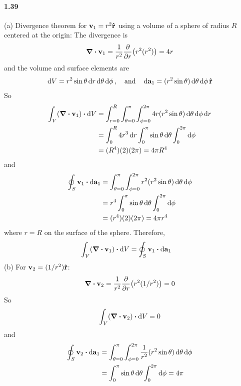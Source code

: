 \documentclass[../main.tex]{subfiles}
\begin{document}
\paragraph{1.39}
(a) Divergence theorem for $\vb{v}_1 = r^2 \vu{r}$ using a volume of a sphere of radius $R$ centered
at the origin: The divergence is
\begin{align*}
    \div{\vb{v}_1} = \frac{1}{r^2} \pdv{r}(r^2 (r^2)) = 4r
\end{align*}
and the volume and surface elements are
\begin{align*}
    \dd{V} = r^2 \sin\theta \dd{r}\dd{\theta}\dd{\phi}, \qand
    \dd{\vb{a}_1} = (r^2 \sin\theta) \dd{\theta}\dd{\phi} \vu{r}
\end{align*}
So
\begin{align*}
    \int_V (\div{\vb{v}_1}) \vdot \dd{V} &= \int_{r=0}^R \int_{\theta=0}^\pi \int_{\phi=0}^{2\pi}
        4r (r^2 \sin\theta) \dd{\theta}\dd{\phi} \dd{r} \\
    &= \int_0^R  4r^3 \dd{r} \int_0^\pi \sin\theta \dd{\theta} \int_0^{2\pi} \dd{\phi} \\
    &= (R^4) (2) (2\pi) = 4\pi R^4
\end{align*}
and 
\begin{align*}
    \oint_S \vb{v}_1 \vdot \dd{\vb{a}_1} &= \int_{\theta = 0}^\pi \int_{\phi = 0}^{2\pi}
        r^2(r^2 \sin\theta) \dd{\theta}\dd{\phi} \\
    &= r^4 \int_0^\pi \sin\theta \dd{\theta} \int_0^{2\pi} \dd{\phi} \\
    &= (r^4) (2) (2\pi) = 4\pi r^4
\end{align*}
where $r = R$ on the surface of the sphere. Therefore, 
\begin{align*}
    \int_V (\div{\vb{v}_1}) \vdot \dd{V} &= \oint_S \vb{v}_1 \vdot \dd{\vb{a}_1}
\end{align*}
(b) For $\vb{v}_2 = (1/r^2)\vu{r}$:
\begin{align*}
    \div{\vb{v}_2} = \frac{1}{r^2} \pdv{r}(r^2 (1/r^2)) = 0
\end{align*}
So
\begin{align*}
    \int_V (\div{\vb{v}_2}) \vdot \dd{V} = 0
\end{align*}
and
\begin{align*}
    \oint_S \vb{v}_2 \vdot \dd{\vb{a}_1} &= \int_{\theta = 0}^\pi \int_{\phi = 0}^{2\pi}
        \frac{1}{r^2} (r^2 \sin\theta) \dd{\theta}\dd{\phi} \\
    &= \int_0^\pi \sin\theta \dd{\theta} \int_0^{2\pi} \dd{\phi} = 4\pi
\end{align*}
\end{document}
